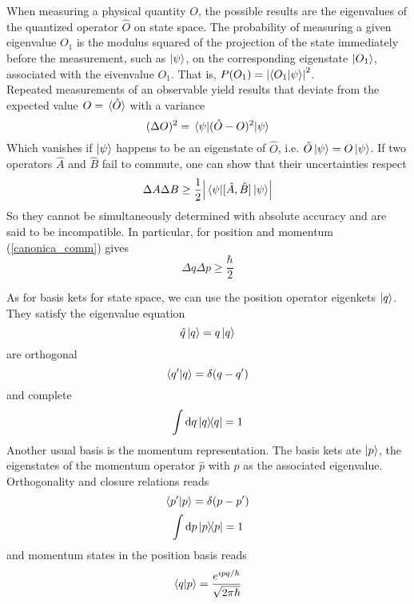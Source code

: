 When measuring a physical quantity $O$, the possible results are the eigenvalues of the quantized operator $\hat{O}$ on state space. The probability of measuring a given eigenvalue $O_1$ is the modulus squared of the projection of the state immediately before the measurement, such as $\ket{\psi}$, on the corresponding eigenstate $\ket{O_1}$, associated with the eivenvalue $O_1$. That is, $P(O_1)=\abs{\bra{O_1}\ket{\psi}}^2$.\\

Repeated measurements of an observable yield results that deviate from the expected value $O=\ev*{\hat{O}}$ with a variance
\begin{equation}
        (\Delta O)^2=\ev{(\hat{O}-O)^2}{\psi}
\end{equation}
Which vanishes if $\ket{\psi}$ happens to be an eigenstate of $\hat{O}$, i.e. $\hat{O}\ket{\psi}=O\ket{\psi}$.  If two operators $\hat{A}$ and $\hat{B}$ fail to commute, one can show that their uncertainties respect
\begin{equation}
    \Delta A\Delta B \geq \frac{1}{2}\abs{\ev{\comm*{\hat{A}}{\hat{B}}}{\psi}}
\end{equation}
So they cannot be simultaneously determined with absolute accuracy and are said to be incompatible. In particular, for position and momentum (\ref{canonica_comm}) gives
\begin{equation}
    \Delta q \Delta p \geq \frac{\hbar}{2}
\end{equation}

As for basis kets for state space, we can use the position operator eigenkets $\ket{q}$. They satisfy the eigenvalue equation
\begin{equation}
    \hat{q}\ket{q}=q\ket{q}
\end{equation}
are orthogonal
\begin{equation}
    \braket{q^\prime}{q}=\delta(q-q^\prime)
\end{equation}
and complete
\begin{equation}
    \int\dd q \dyad{q}={1}
\end{equation}
Another usual basis is the momentum representation. The basis kets ate $\ket{p}$, the eigenstates of the momentum operator $\hat{p}$ with $p$ as the associated eigenvalue. Orthogonality and closure relations reads
\begin{equation}
    \braket{p^\prime}{p}=\delta(p-p^\prime)
\end{equation}
\begin{equation}
    \int\dd p \dyad{p}=1
\end{equation}
and momentum states in the position basis reads
\begin{equation}
    \braket{q}{p}=\frac{e^{{i}pq/\hbar}}{\sqrt{2\pi\hbar}}
\end{equation}

